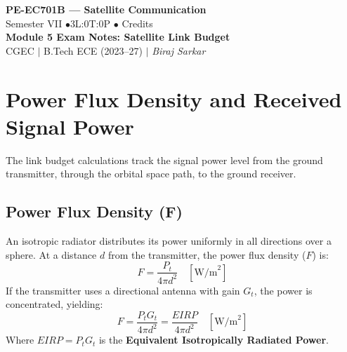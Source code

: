 \documentclass[12pt,a4paper]{article}
\begin{document}

\begin{center}
  {\LARGE\bfseries\color{myred} PE-EC701B --- Satellite Communication}\\[5pt]
  {\normalsize\color{mydark} Semester VII \quad$\bullet$\quad 3L:0T:0P \quad$\bullet$ Credits}\\[3pt]
  {\normalsize\color{myteal}\textbf{Module 5 Exam Notes: Satellite Link Budget}}\\[3pt]
  {\small\color{mydark} CGEC \;$|$\; B.Tech ECE (2023--27) \;$|$\; \textit{Biraj Sarkar}}
\end{center}
\vspace{2pt}
\noindent{\color{myred}\rule{\linewidth}{1.5pt}}
\vspace{2pt}

\hypersetup{linkcolor=mydark}
\tableofcontents
\hypersetup{linkcolor=myteal}
\newpage

\section{Power Flux Density and Received Signal Power}

The link budget calculations track the signal power level from the ground transmitter, through the orbital space path, to the ground receiver.

\subsection{Power Flux Density (F)}
An isotropic radiator distributes its power uniformly in all directions over a sphere. At a distance $d$ from the transmitter, the power flux density ($F$) is:
\begin{equation}
  F = \frac{P_t}{4\pi d^2} \quad [\text{W/m}^2]
\end{equation}
If the transmitter uses a directional antenna with gain $G_t$, the power is concentrated, yielding:
\begin{equation}
  F = \frac{P_t G_t}{4\pi d^2} = \frac{EIRP}{4\pi d^2} \quad [\text{W/m}^2]
\end{equation}
Where $EIRP = P_t G_t$ is the \textbf{Equivalent Isotropically Radiated Power}.
\end{document}
